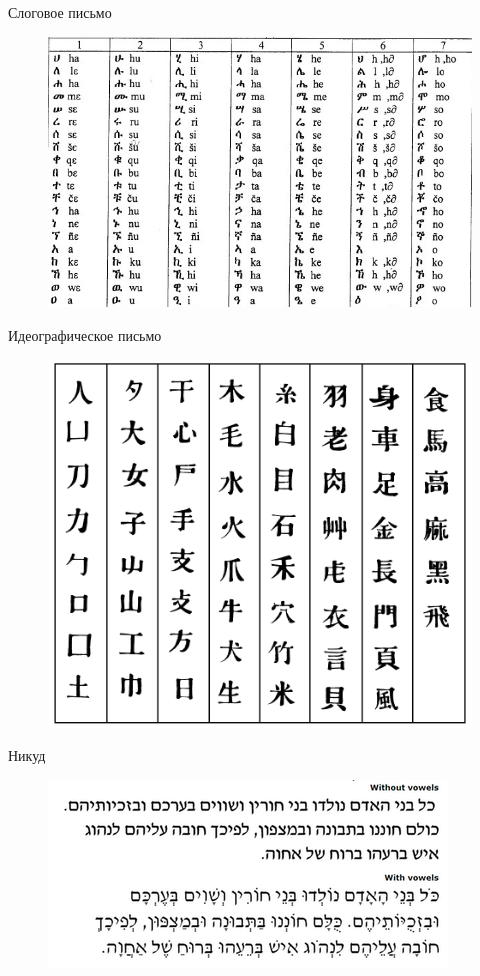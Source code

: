 \documentclass{beamer}
\begin{document}
\begin{frame}{Слоговое письмо}
\begin{figure}[H]
\includegraphics[scale=0.45]{amharic.png} 
\end{figure}
\end{frame}

\begin{frame}{Идеографическое письмо}
\begin{figure}[H]
\includegraphics[scale=0.6]{ideographic.png} 
\end{figure}
\end{frame}

\begin{frame}{Никуд}
\begin{figure}[H]
\includegraphics[scale=0.6]{hebrew.png} 
\end{figure}
\end{frame}
\end{document}
